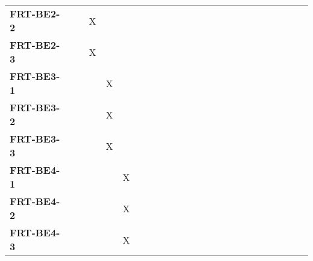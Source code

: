 \documentclass[12pt, titlepage]{article}
\begin{document}
\begin{landscape}
\begin{longtable}{|l|cccccccccccccccc|}
		\textbf{FRT-BE2-2}  & ~                                                         & X            & ~            & ~            & ~            & ~            & ~            & ~            & ~            & ~             & ~             & ~             & ~             & ~             & ~             & ~             \\
		\textbf{FRT-BE2-3}  & ~                                                         & X            & ~            & ~            & ~            & ~            & ~            & ~            & ~            & ~             & ~             & ~             & ~             & ~             & ~             & ~             \\
		\textbf{FRT-BE3-1}  & ~                                                         & ~            & X            & ~            & ~            & ~            & ~            & ~            & ~            & ~             & ~             & ~             & ~             & ~             & ~             & ~             \\
		\textbf{FRT-BE3-2}  & ~                                                         & ~            & X            & ~            & ~            & ~            & ~            & ~            & ~            & ~             & ~             & ~             & ~             & ~             & ~             & ~             \\
		\textbf{FRT-BE3-3}  & ~                                                         & ~            & X            & ~            & ~            & ~            & ~            & ~            & ~            & ~             & ~             & ~             & ~             & ~             & ~             & ~             \\
		\textbf{FRT-BE4-1}  & ~                                                         & ~            & ~            & X            & ~            & ~            & ~            & ~            & ~            & ~             & ~             & ~             & ~             & ~             & ~             & ~             \\
		\textbf{FRT-BE4-2}  & ~                                                         & ~            & ~            & X            & ~            & ~            & ~            & ~            & ~            & ~             & ~             & ~             & ~             & ~             & ~             & ~             \\
		\textbf{FRT-BE4-3}  & ~                                                         & ~            & ~            & X            & ~            & ~            & ~            & ~            & ~            & ~             & ~             & ~             & ~             & ~             & ~             & ~             \\

\end{longtable}
\end{landscape}
\end{document}
